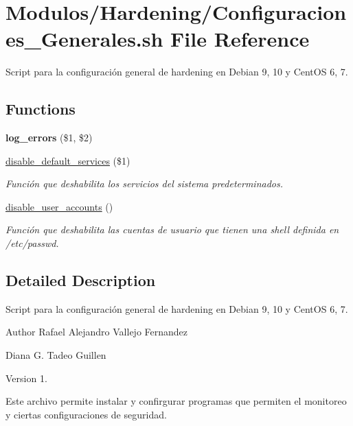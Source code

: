\hypertarget{Configuraciones__Generales_8sh}{}\section{Modulos/\+Hardening/\+Configuraciones\+\_\+\+Generales.sh File Reference}
\label{Configuraciones__Generales_8sh}


Script para la configuración general de hardening en Debian 9, 10 y Cent\+OS 6, 7.  


\subsection*{Functions}
\begin{DoxyCompactItemize}
\item 
\mbox{\label{Configuraciones__Generales_8sh_a92067b58a8478c9841b2cd9b75ea3565}} 
{\bfseries log\+\_\+errors} (\$1, \$2)
\item 
\hyperlink{Configuraciones__Generales_8sh_ad83bd5e5089ad1546035126564e2a5d1}{disable\+\_\+default\+\_\+services} (\$1)
\begin{DoxyCompactList}\small\item\em Función que deshabilita los servicios del sistema predeterminados. \end{DoxyCompactList}\item 
\mbox{\label{Configuraciones__Generales_8sh_af9950a47b946dd1e1d14b44a39ad3a7d}} 
\hyperlink{Configuraciones__Generales_8sh_af9950a47b946dd1e1d14b44a39ad3a7d}{disable\+\_\+user\+\_\+accounts} ()
\begin{DoxyCompactList}\small\item\em Función que deshabilita las cuentas de usuario que tienen una shell definida en /etc/passwd. \end{DoxyCompactList}\end{DoxyCompactItemize}


\subsection{Detailed Description}
Script para la configuración general de hardening en Debian 9, 10 y Cent\+OS 6, 7. 

\begin{DoxyAuthor}{Author}
Rafael Alejandro Vallejo Fernandez 

Diana G. Tadeo Guillen 
\end{DoxyAuthor}
\begin{DoxyVersion}{Version}
1.
\end{DoxyVersion}
Este archivo permite instalar y confirgurar programas que permiten el monitoreo y ciertas configuraciones de seguridad. 

